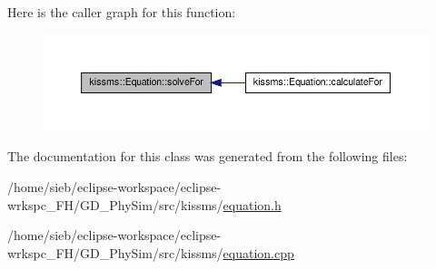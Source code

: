 Here is the caller graph for this function\-:
\nopagebreak
\begin{figure}[H]
\begin{center}
\leavevmode
\includegraphics[width=350pt]{classkissms_1_1_equation_ad2a8ce5aff621d4e19b5042fcedf04de_icgraph}
\end{center}
\end{figure}




The documentation for this class was generated from the following files\-:\begin{DoxyCompactItemize}
\item 
/home/sieb/eclipse-\/workspace/eclipse-\/wrkspc\-\_\-\-F\-H/\-G\-D\-\_\-\-Phy\-Sim/src/kissms/\hyperlink{equation_8h}{equation.\-h}\item 
/home/sieb/eclipse-\/workspace/eclipse-\/wrkspc\-\_\-\-F\-H/\-G\-D\-\_\-\-Phy\-Sim/src/kissms/\hyperlink{equation_8cpp}{equation.\-cpp}\end{DoxyCompactItemize}
